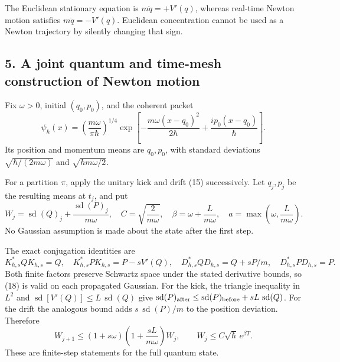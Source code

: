 \documentclass[11pt,a4paper]{article}
\begin{document}
The Euclidean stationary equation is \(m\ddot q=+V'(q)\), whereas
real-time Newton motion satisfies \(m\ddot q=-V'(q)\). Euclidean
concentration cannot be used as a Newton trajectory by silently changing
that sign.

\hypertarget{a-joint-quantum-and-time-mesh-construction-of-newton-motion}{%
\subsection{5. A joint quantum and time-mesh construction of Newton
motion}\label{a-joint-quantum-and-time-mesh-construction-of-newton-motion}}

Fix \(\omega>0\), initial \((q_0,p_0)\), and the coherent packet \[
 \psi_\hbar(x)=\left(\frac{m\omega}{\pi \hbar}\right)^{1/4}
 \exp\!\left[-\frac{m\omega(x-q_0)^2}{2\hbar}
            +\frac{i p_0(x-q_0)}\hbar\right].\tag{16}
\] Its position and momentum means are \(q_0,p_0\), with standard
deviations \(\sqrt{\hbar/(2m\omega)}\) and \(\sqrt{hm\omega/2}\).

For a partition \(\pi\), apply the unitary kick and drift (15)
successively. Let \(q_j,p_j\) be the resulting means at \(t_j\), and put
\[W_j=\operatorname{sd}(Q)_j+
          \frac{\operatorname{sd}(P)_j}{m\omega},\quad
 C=\sqrt{\frac2{m\omega}},\quad
 \beta=\omega+\frac{L}{m\omega},\quad
 a=\max\!\left(\omega,\frac L{m\omega}\right).\tag{17}\] No Gaussian
assumption is made about the state after the first step.

The exact conjugation identities are \[K_{\hbar,s}^*QK_{\hbar,s}=Q,\quad
 K_{\hbar,s}^*PK_{\hbar,s}=P-sV'(Q),\quad
 D_{\hbar,s}^*QD_{\hbar,s}=Q+sP/m,\quad
 D_{\hbar,s}^*PD_{\hbar,s}=P.\tag{18}\] Both finite factors preserve
Schwartz space under the stated derivative bounds, so (18) is valid on
each propagated Gaussian. For the kick, the triangle inequality in
\(L^2\) and \(\operatorname{sd}[V'(Q)]\le L\,\operatorname{sd}(Q)\) give
\(\operatorname{sd}(P)_{\rm after}\le \operatorname{sd}(P)_{\rm before}+sL\,\operatorname{sd}(Q)\).
For the drift the analogous bound adds \(s\,\operatorname{sd}(P)/m\) to
the position deviation. Therefore \[W_{j+1}\le
 (1+s\omega)\left(1+\frac{sL}{m\omega}\right)W_j,
\qquad
 W_j\le C\sqrt \hbar\,e^{\beta T}.\tag{19}\] These are finite-step
statements for the full quantum state.
\end{document}
